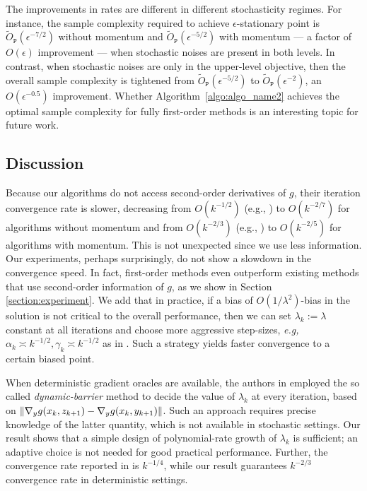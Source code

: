 %
The improvements in rates are different in different stochasticity regimes. 
For instance, the sample complexity required to achieve $\epsilon$-stationary point is $\tilde{O}_{\texttt{P}}(\epsilon^{-7/2})$ without momentum and $\tilde{O}_{\texttt{P}} (\epsilon^{-5/2})$ with momentum --- a factor of $O(\epsilon)$ improvement --- when stochastic noises are present in both levels. 
In contrast, when stochastic noises are only in the upper-level objective, then the overall sample complexity is tightened from $\tilde{O}_{\texttt{P}}(\epsilon^{-5/2})$ to $\tilde{O}_{\texttt{P}}(\epsilon^{-2})$, an $O(\epsilon^{-0.5})$ improvement. 
Whether Algorithm~\ref{algo:algo_name2} achieves the optimal sample complexity for fully first-order methods is an interesting topic for future work.




\subsection{Discussion}
Because our algorithms do not access second-order derivatives of $g$, their iteration convergence rate is slower, decreasing from  $O(k^{-1/2})$ (e.g., \cite{chen2021closing}) to $O(k^{-2/7})$ for algorithms without momentum and  from $O(k^{-2/3})$ (e.g., \cite{khanduri2021near}) to $O(k^{-2/5})$ for algorithms with momentum. 
This is not unexpected since we use less information. 
Our experiments, perhaps surprisingly, do not show a slowdown in the convergence speed.
In fact, first-order methods even outperform existing methods that use second-order information of $g$, as we show in Section \ref{section:experiment}.
We add that in practice, if a bias of $O(1/\lambda^2)$-bias in the solution is not critical to the overall performance, then we can set $\lambda_k := \lambda$ constant at all iterations and choose more aggressive step-sizes, {\it e.g,} $\alpha_k \asymp k^{-1/2}, \gamma_k \asymp k^{-1/2}$ as in \cite{chen2021closing}.
Such a strategy yields faster convergence to a certain biased point. 

When deterministic gradient oracles are available, the authors in \cite{ye2022bome} employed the so called {\it dynamic-barrier} method \cite{gong2021automatic} to decide the value of $\lambda_k$ at every iteration, based on $\|\nabla_y g(x_k,z_{k+1}) - \nabla_y g(x_k,y_{k+1})\|$. 
Such an approach requires precise knowledge of the latter quantity, which is not available in stochastic settings. 
Our result shows that  a simple design of polynomial-rate growth of $\lambda_k$ is sufficient; an adaptive choice is not needed for good practical performance. 
Further, the convergence rate reported in \cite{ye2022bome} is $k^{-1/4}$, while our result guarantees $k^{-2/3}$ convergence rate in deterministic settings. 

